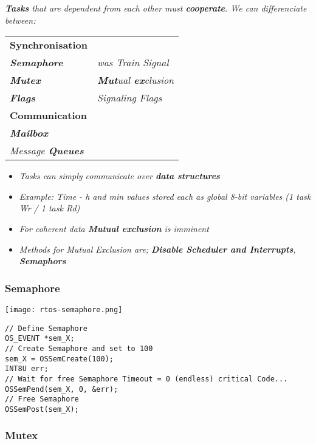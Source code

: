 \textit{
    \textbf{Tasks} that are dependent from each other must
    \textbf{cooperate}. We can differenciate between:
}

\begin{tabular}{ll}
    \textbf{Synchronisation} & \\
    \textit{\textbf{Semaphore}} & \textit{was Train Signal} \\
    \textit{\textbf{Mutex}}     & \textit{\textbf{Mut}ual \textbf{ex}clusion} \\
    \textit{\textbf{Flags}}     & \textit{Signaling Flags} \\
    \textbf{Communication} & \\
    \textit{\textbf{Mailbox}} & \\
    \textit{Message \textbf{Queues}} & \\
\end{tabular}

\textit{
    \newline
}
\begin{itemize}
    \item{\textit{
        Tasks can simply communicate over \textbf{data structures}
    }}
    \item{\textit{
        Example: Time - h and min values stored each as
        global 8-bit variables (1 task Wr / 1 task Rd)
    }}
    \item{\textit{
        For coherent data \textbf{Mutual exclusion} is imminent
    }}
    \item{\textit{
        Methods for Mutual Exclusion are; \textbf{Disable Scheduler and Interrupts},
        \textbf{Semaphors}
    }}
\end{itemize}

\subsubsection{Semaphore}

\texttt{[image: rtos-semaphore.png]}

\begin{lstlisting}
// Define Semaphore
OS_EVENT *sem_X;
// Create Semaphore and set to 100
sem_X = OSSemCreate(100);
INT8U err;
// Wait for free Semaphore Timeout = 0 (endless) critical Code...
OSSemPend(sem_X, 0, &err);
// Free Semaphore
OSSemPost(sem_X);
\end{lstlisting}

\subsubsection{Mutex}

